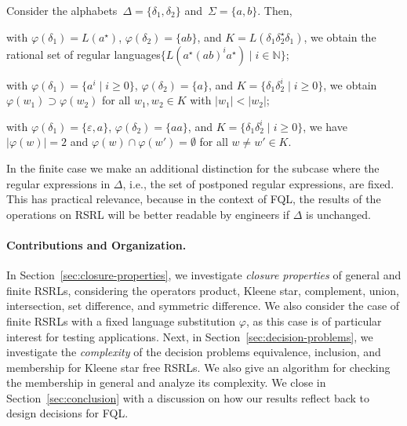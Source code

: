 \documentclass[envcountsame]{llncs}
\newcommand{\bN}{\ensuremath{\mathbb{N}}\xspace}
\newcommand{\RegularlyGeneratedLanguageSet}{rational set of regular languages\xspace}
\newcommand{\RegularlyGeneratedLanguageSetAbbrev}{RSRL\xspace}
\newcommand{\RegularlyGeneratedLanguageSetsAbbrev}{RSRLs\xspace}
\newcommand{\FQL}{FQL\xspace}
\begin{document}
\begin{example}
  Consider the alphabets~$\Delta = \{ \delta_1, \delta_2 \}$
  and~$\Sigma = \{ a, b \}$. Then,
\begin{inparaenum}[\bfseries(1)]
  \item  with $\varphi(\delta_1) = L(a^\star)$,
    $\varphi(\delta_2) = \{ ab \}$, and $K =
    L(\delta_1\delta_2^\star\delta_1)$, we obtain the
    \RegularlyGeneratedLanguageSet $\{ L(a^\star(ab)^ia^\star) \mid i
    \in \bN \}$;
  \item with $\varphi(\delta_1) = \{ a^i \mid i \geq 0 \}$,
    $\varphi(\delta_2) = \{ a \}$, and $K = \{ \delta_1\delta_2^i \mid
    i \geq 0 \}$, we obtain $\varphi(w_1) \supset \varphi(w_2)$ for
    all $w_1, w_2 \in K$ with $|w_1| < |w_2|$;
  \item with $\varphi(\delta_1) = \{ \varepsilon, a \}$,
    $\varphi(\delta_2) = \{ aa \}$, and $K = \{ \delta_1\delta_2^i
    \mid i \geq 0 \}$, we have $|\varphi(w)| = 2$ and $\varphi(w) \cap
    \varphi(w') = \emptyset$ for all $w\neq w' \in K$.
  \end{inparaenum}
\end{example}



In the finite case we make an additional distinction for the
subcase where the regular expressions in $\Delta$, i.e., the set of
postponed regular expressions, are fixed. This has practical
relevance, because in the context of \FQL, the results of the
operations on \RegularlyGeneratedLanguageSetAbbrev will be better
readable by engineers if $\Delta$ is unchanged.

















\paragraph{Contributions and Organization.}
In Section~\ref{sec:closure-properties}, we investigate \emph{closure
  properties} of general and finite
\RegularlyGeneratedLanguageSetsAbbrev, considering the operators
product, Kleene star, complement, union, intersection, set difference,
and symmetric difference.
We also consider the case of finite
\RegularlyGeneratedLanguageSetsAbbrev with a fixed language
substitution $\varphi$, as this case is of particular interest for
testing applications.
Next, in Section~\ref{sec:decision-problems}, we investigate the
\emph{complexity} of the decision problems equivalence, inclusion, and
membership for Kleene star free \RegularlyGeneratedLanguageSetsAbbrev.
We also give an algorithm for checking the membership in general and
analyze its complexity.
We close in Section~\ref{sec:conclusion} with a discussion on how our
results reflect back to design decisions for \FQL.
\end{document}
